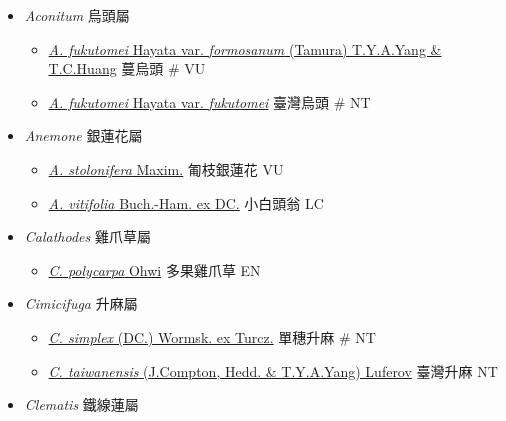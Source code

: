 
  \begin{itemize}
 \item[] \textit{Aconitum} 烏頭屬
                                
  \begin{itemize}
        \item[] \href{http://www.theplantlist.org/tpl1.1/search?q=Aconitum+fukutomei+var.+formosanum}{\textit{A. fukutomei} Hayata var. \textit{formosanum} (Tamura) T.Y.A.Yang \& T.C.Huang}   蔓烏頭  \# VU
        \item[] \href{http://www.theplantlist.org/tpl1.1/search?q=Aconitum+fukutomei+var.+fukutomei}{\textit{A. fukutomei} Hayata var. \textit{fukutomei}}   臺灣烏頭  \# NT
  \end{itemize}
 \item[] \textit{Anemone} 銀蓮花屬
                                
  \begin{itemize}
        \item[] \href{http://www.theplantlist.org/tpl1.1/search?q=Anemone+stolonifera}{\textit{A. stolonifera} Maxim.}   匍枝銀蓮花   VU
        \item[] \href{http://www.theplantlist.org/tpl1.1/search?q=Anemone+vitifolia}{\textit{A. vitifolia} Buch.-Ham. ex DC.}   小白頭翁   LC
  \end{itemize}
 \item[] \textit{Calathodes} 雞爪草屬
                                
  \begin{itemize}
        \item[] \href{http://www.theplantlist.org/tpl1.1/search?q=Calathodes+polycarpa}{\textit{C. polycarpa} Ohwi}   多果雞爪草   EN
  \end{itemize}
 \item[] \textit{Cimicifuga} 升麻屬
                                
  \begin{itemize}
        \item[] \href{http://www.theplantlist.org/tpl1.1/search?q=Cimicifuga+simplex}{\textit{C. simplex} (DC.) Wormsk. ex Turcz.}   單穗升麻  \# NT
        \item[] \href{http://www.theplantlist.org/tpl1.1/search?q=Cimicifuga+taiwanensis}{\textit{C. taiwanensis} (J.Compton, Hedd. \& T.Y.A.Yang) Luferov}   臺灣升麻   NT
  \end{itemize}
 \item[] \textit{Clematis} 鐵線蓮屬
                                

\end{itemize}
